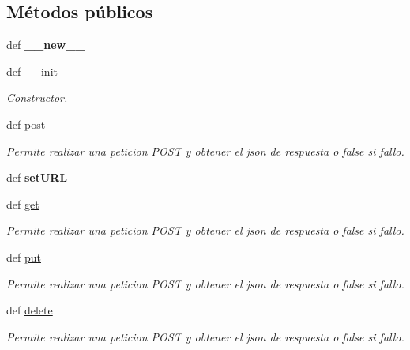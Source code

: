 \subsection*{Métodos públicos}
\begin{DoxyCompactItemize}
\item 
\hypertarget{classsrc_1_1models_1_1conectividad_1_1_conectividad_a84b4dec546a5a1c5d7d8b410f835f31e}{def {\bfseries \-\_\-\-\_\-new\-\_\-\-\_\-}}\label{classsrc_1_1models_1_1conectividad_1_1_conectividad_a84b4dec546a5a1c5d7d8b410f835f31e}

\item 
def \hyperlink{classsrc_1_1models_1_1conectividad_1_1_conectividad_ac32362e5db32d788fb1bb0bc21b36b6e}{\-\_\-\-\_\-init\-\_\-\-\_\-}
\begin{DoxyCompactList}\small\item\em Constructor. \end{DoxyCompactList}\item 
def \hyperlink{classsrc_1_1models_1_1conectividad_1_1_conectividad_a1c6a08424c9406f4e47bfa4f8deb3bc6}{post}
\begin{DoxyCompactList}\small\item\em Permite realizar una peticion P\-O\-S\-T y obtener el json de respuesta o false si fallo. \end{DoxyCompactList}\item 
\hypertarget{classsrc_1_1models_1_1conectividad_1_1_conectividad_ab9eed8c99dab97bba7d998958e202705}{def {\bfseries set\-U\-R\-L}}\label{classsrc_1_1models_1_1conectividad_1_1_conectividad_ab9eed8c99dab97bba7d998958e202705}

\item 
def \hyperlink{classsrc_1_1models_1_1conectividad_1_1_conectividad_ac0413d7dd62357ed0c3194a912eab085}{get}
\begin{DoxyCompactList}\small\item\em Permite realizar una peticion P\-O\-S\-T y obtener el json de respuesta o false si fallo. \end{DoxyCompactList}\item 
def \hyperlink{classsrc_1_1models_1_1conectividad_1_1_conectividad_ac093b5f0c19ff3fc5e5ee44eaf0fa54e}{put}
\begin{DoxyCompactList}\small\item\em Permite realizar una peticion P\-O\-S\-T y obtener el json de respuesta o false si fallo. \end{DoxyCompactList}\item 
def \hyperlink{classsrc_1_1models_1_1conectividad_1_1_conectividad_a9b9bbcb408c76c1c051633929d179be3}{delete}
\begin{DoxyCompactList}\small\item\em Permite realizar una peticion P\-O\-S\-T y obtener el json de respuesta o false si fallo. \end{DoxyCompactList}\end{DoxyCompactItemize}
